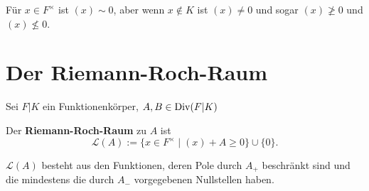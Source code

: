 \begin{beispiel}
    Für $x \in F^{\times}$ ist $(x) \sim 0$, aber wenn $x \notin K$ ist $(x) \ne 0$ und sogar $(x) \not \geq 0$ und $(x) \not \leq 0$.
\end{beispiel}

\section{Der Riemann-Roch-Raum}
Sei $F|K$ ein Funktionenkörper, $A,B \in \operatorname{Div}(F|K)$

\begin{definition}
    Der \textbf{Riemann-Roch-Raum} zu $A$ ist 
    $$ \mathcal{L}(A) := \{x \in F^{\times} \mid (x) + A \geq 0\} \cup \{0\}.$$
\end{definition}

\begin{bemerkungnr}
    $\mathcal{L}(A)$ besteht aus den Funktionen, deren Pole durch $A_+$ beschränkt sind und die mindestens die
    durch $A_-$ vorgegebenen Nullstellen haben.
\end{bemerkungnr}

